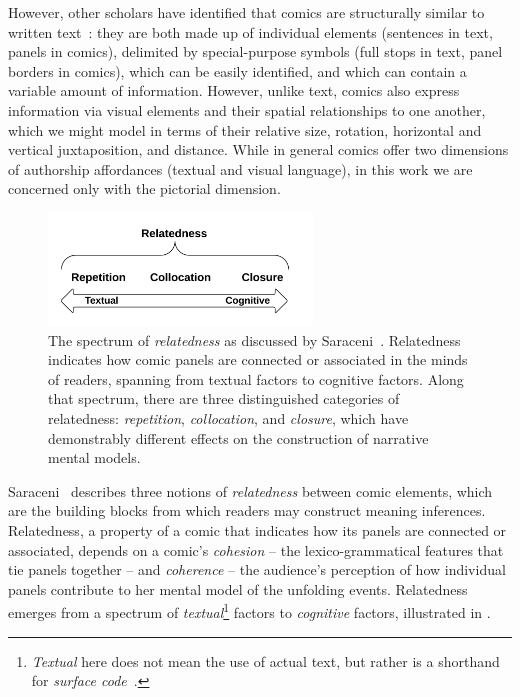 However, other scholars have identified that comics are structurally similar to written
text~\cite{saraceni2016relatedness}: they are both made up of individual
elements (sentences in text, panels in comics), delimited by special-purpose
symbols (full stops in text, panel borders in comics), which can be easily
identified, and which can contain a variable amount of information. However,
unlike text, comics also express information via visual elements and their spatial
relationships to one another, which we might model in terms of their
relative size, rotation, horizontal and vertical juxtaposition, and
distance. While in general comics offer two dimensions of authorship
affordances (textual and visual language), in this work we are concerned
only with the pictorial dimension.
%
\begin{figure}
\centering
	\includegraphics[width=7cm]{relatedness.png}
	\caption{
		The spectrum of \emph{relatedness} as discussed by
                Saraceni~\cite{saraceni2016relatedness}. Relatedness indicates how 
		comic panels are connected or associated in the minds of 
		readers, spanning from textual factors to cognitive factors. 
		Along that spectrum, there are three  distinguished 
		categories of relatedness: \emph{repetition}, 
		\emph{collocation}, and \emph{closure}, which have
		demonstrably different effects on the construction of
		narrative mental models.
		}
	\label{figure:relatedness}
\end{figure}
%
Saraceni~\cite{saraceni2016relatedness} describes three notions of
\emph{relatedness} between comic elements, which are the building blocks
from which readers may construct meaning inferences.
Relatedness, a property of a comic that indicates how its panels are
connected or associated, depends on a comic's \emph{cohesion} -- the
lexico-grammatical features that tie panels together -- and \emph{coherence} --
the audience's perception of how individual panels contribute to her mental model
of the unfolding events. Relatedness emerges from a spectrum of \emph{textual}\footnote{\emph{Textual} here does not mean the use of actual text, but rather is a shorthand for \emph{surface code}~\cite{zwaan1998situation}.}
factors to \emph{cognitive} factors, illustrated in .
